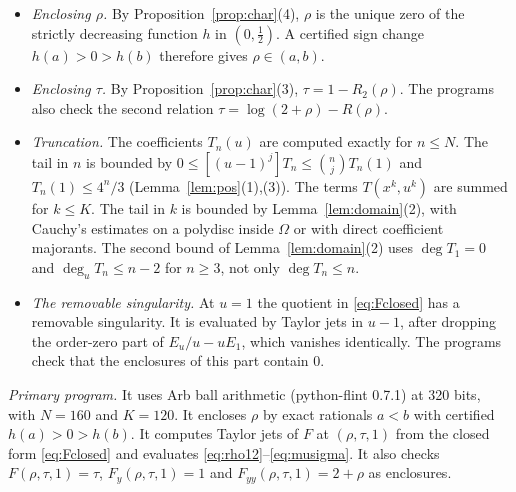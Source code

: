 \documentclass[11pt]{amsart}
\theoremstyle{definition}
\theoremstyle{remark}
\numberwithin{equation}{section}
\begin{document}
\begin{itemize}
\item \emph{Enclosing \(\rho\).} By Proposition~\ref{prop:char}(4), \(\rho\) is the unique zero of the strictly decreasing function \(h\) in \((0,\frac12)\). A certified sign change \(h(a)>0>h(b)\) therefore gives \(\rho\in(a,b)\).
\item \emph{Enclosing \(\tau\).} By Proposition~\ref{prop:char}(3), \(\tau=1-R_2(\rho)\). The programs also check the second relation \(\tau=\log(2+\rho)-R(\rho)\).
\item \emph{Truncation.} The coefficients \(T_n(u)\) are computed exactly for \(n\le N\). The tail in \(n\) is bounded by \(0\le[(u-1)^j]T_n\le\binom njT_n(1)\) and \(T_n(1)\le4^n/3\) (Lemma~\ref{lem:pos}(1),(3)). The terms \(T(x^k,u^k)\) are summed for \(k\le K\). The tail in \(k\) is bounded by Lemma~\ref{lem:domain}(2), with Cauchy's estimates on a polydisc inside \(\Omega\) or with direct coefficient majorants. The second bound of Lemma~\ref{lem:domain}(2) uses \(\deg T_1=0\) and \(\deg_uT_n\le n-2\) for \(n\ge3\), not only \(\deg T_n\le n\).
\item \emph{The removable singularity.} At \(u=1\) the quotient in \eqref{eq:Fclosed} has a removable singularity. It is evaluated by Taylor jets in \(u-1\), after dropping the order-zero part of \(E_u/u-uE_1\), which vanishes identically. The programs check that the enclosures of this part contain \(0\).
\end{itemize}

\emph{Primary program.} It uses Arb ball arithmetic (python-flint 0.7.1) at 320 bits, with \(N=160\) and \(K=120\). It encloses \(\rho\) by exact rationals \(a<b\) with certified \(h(a)>0>h(b)\). It computes Taylor jets of \(F\) at \((\rho,\tau,1)\) from the closed form \eqref{eq:Fclosed} and evaluates \eqref{eq:rho12}--\eqref{eq:musigma}. It also checks \(F(\rho,\tau,1)=\tau\), \(F_y(\rho,\tau,1)=1\) and \(F_{yy}(\rho,\tau,1)=2+\rho\) as enclosures.
\end{document}
